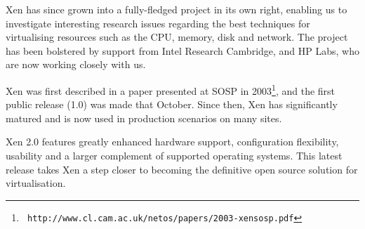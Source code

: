 Xen has since grown into a fully-fledged project in its own right,
enabling us to investigate interesting research issues regarding the
best techniques for virtualising resources such as the CPU, memory,
disk and network.  The project has been bolstered by support from
Intel Research Cambridge, and HP Labs, who are now working closely
with us.

Xen was first described in a paper presented at SOSP in
2003\footnote{\tt
  http://www.cl.cam.ac.uk/netos/papers/2003-xensosp.pdf}, and the
first public release (1.0) was made that October.  Since then, Xen has
significantly matured and is now used in production scenarios on many
sites.

Xen 2.0 features greatly enhanced hardware support, configuration
flexibility, usability and a larger complement of supported operating
systems. This latest release takes Xen a step closer to becoming the
definitive open source solution for virtualisation.
